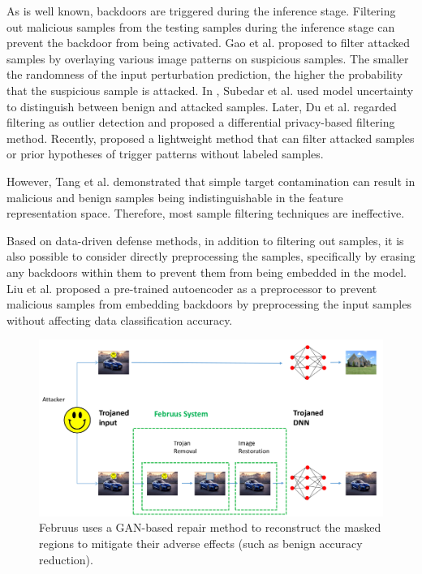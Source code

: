 \documentclass[conference]{IEEEtran}
\begin{document}
As is well known, backdoors are triggered during the inference stage.
Filtering out malicious samples from the testing samples during the inference stage can prevent the backdoor
from being activated. Gao et al. \cite{b71} proposed to filter attacked samples by overlaying various image patterns
on suspicious samples. The smaller the randomness of the input perturbation prediction, the higher the probability
that the suspicious sample is attacked. In \cite{b72}, Subedar et al. used model uncertainty to distinguish between
benign and attacked samples. Later, Du et al. \cite{b73} regarded filtering as outlier detection and proposed a
differential privacy-based filtering method. Recently, \cite{b74} proposed a lightweight method that can filter
attacked samples or prior hypotheses of trigger patterns without labeled samples.

However, Tang et al.\cite{b70} demonstrated that
simple target contamination can result in malicious and benign samples being
indistinguishable in the feature representation space. Therefore, most
sample filtering techniques are ineffective.

Based on data-driven defense methods, in addition to filtering out samples,
it is also possible to consider directly preprocessing the samples,
specifically by erasing any backdoors within them to prevent them from being embedded in the model.
Liu et al.\cite{b75} proposed a pre-trained autoencoder as a preprocessor to prevent malicious samples from embedding backdoors
by preprocessing the input samples without affecting data classification accuracy.

\begin{figure}[htbp]
    \centerline{\includegraphics[width=1.0\linewidth,height=0.5\linewidth]{picture/f9.png}}
    \caption{Februus uses a GAN-based
    repair method to reconstruct the masked regions to mitigate their 
    adverse effects (such as benign accuracy reduction).}
    \label{fig10}
\end{figure}
\end{document}
